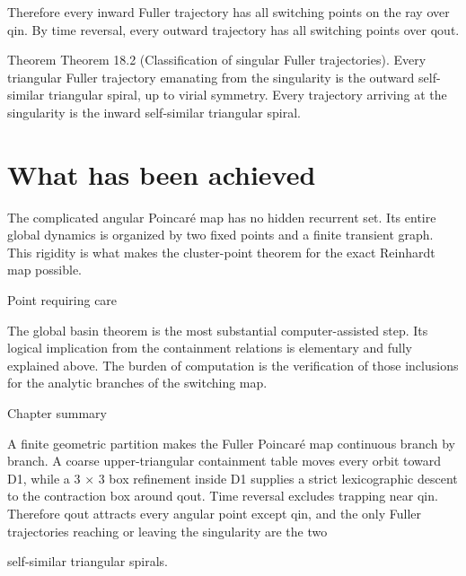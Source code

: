 Therefore every inward Fuller trajectory has all switching points on the ray over qin. By time reversal, every outward trajectory has all switching points over qout.


\begin{statementbox}{Theorem}
Theorem 18.2 (Classification of singular Fuller trajectories). Every triangular Fuller trajectory emanating from the singularity is the outward self-similar triangular spiral, up to virial symmetry. Every trajectory arriving at the singularity is the inward self-similar triangular spiral.
\end{statementbox}

\section{What has been achieved}

The complicated angular Poincaré map has no hidden recurrent set. Its entire global dynamics is organized by two fixed points and a finite transient graph. This rigidity is what makes the cluster-point theorem for the exact Reinhardt map possible.


\begin{insightbox}{Point requiring care}
\end{insightbox}

The global basin theorem is the most substantial computer-assisted step. Its logical implication from the containment relations is elementary and fully explained above. The burden of computation is the verification of those inclusions for the analytic branches of the switching map.


\begin{insightbox}{Chapter summary}
\end{insightbox}

A finite geometric partition makes the Fuller Poincaré map continuous branch by branch. A coarse upper-triangular containment table moves every orbit toward D1, while a 3 × 3 box refinement inside D1 supplies a strict lexicographic descent to the contraction box around qout. Time reversal excludes trapping near qin. Therefore qout attracts every angular point except qin, and the only Fuller trajectories reaching or leaving the singularity are the two


self-similar triangular spirals.

